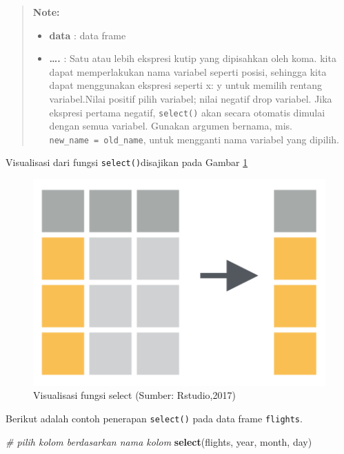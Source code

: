 \documentclass[]{book}
\newenvironment{Shaded}{\begin{snugshade}}{\end{snugshade}}
\newcommand{\KeywordTok}[1]{\textcolor[rgb]{0.13,0.29,0.53}{\textbf{#1}}}
\newcommand{\CommentTok}[1]{\textcolor[rgb]{0.56,0.35,0.01}{\textit{#1}}}
\newcommand{\NormalTok}[1]{#1}
\providecommand{\tightlist}{%
  \setlength{\itemsep}{0pt}\setlength{\parskip}{0pt}}
\begin{document}
\begin{quote}
\textbf{Note: }

\begin{itemize}
\tightlist
\item
  \textbf{data} : data frame
\item
  \textbf{\ldots{}.} : Satu atau lebih ekspresi kutip yang dipisahkan
  oleh koma. kita dapat memperlakukan nama variabel seperti posisi,
  sehingga kita dapat menggunakan ekspresi seperti x: y untuk memilih
  rentang variabel.Nilai positif pilih variabel; nilai negatif drop
  variabel. Jika ekspresi pertama negatif, \texttt{select()} akan secara
  otomatis dimulai dengan semua variabel. Gunakan argumen bernama, mis.
  \texttt{new\_name\ =\ old\_name}, untuk mengganti nama variabel yang
  dipilih.
\end{itemize}
\end{quote}

Visualisasi dari fungsi \texttt{select()}disajikan pada Gambar
\ref{fig:select}

\begin{figure}

{\centering \includegraphics[width=6.15in]{select} 

}

\caption{Visualisasi fungsi select (Sumber: Rstudio,2017)}\label{fig:select}
\end{figure}

Berikut adalah contoh penerapan \texttt{select()} pada data frame
\texttt{flights}.

\begin{Shaded}
\begin{Highlighting}[]
\CommentTok{# pilih kolom berdasarkan nama kolom}
\KeywordTok{select}\NormalTok{(flights, year, month, day)}
\end{Highlighting}
\end{Shaded}
\end{document}
